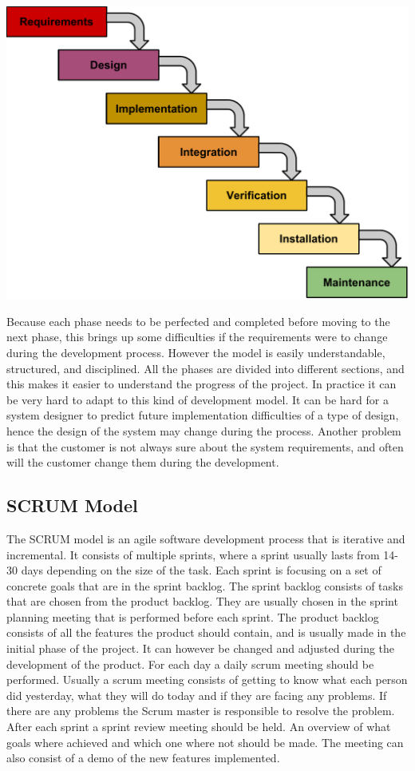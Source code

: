 \includegraphics[scale=0.6]{../Figures/Waterfall-model.pdf}

Because each phase needs to be perfected and completed before moving to the next phase, this brings up some difficulties if the requirements were to change during the development process. 
However the model is easily understandable, structured, and disciplined. 
All the phases are divided into different sections, and this makes it easier to understand the progress of the project.
In practice it can be very hard to adapt to this kind of development model. 
It can be hard for a system designer to predict future implementation difficulties of a type of design, hence the design of the system may change during the process.
Another problem is that the customer is not always sure about the system requirements, and often will the customer change them during the development.

\subsection{SCRUM Model}

The SCRUM model is an agile software development process that is iterative and incremental.
It consists of multiple sprints, where a sprint usually lasts from 14-30 days depending on the size of the task.
Each sprint is focusing on a set of concrete goals that are in the sprint backlog.
The sprint backlog consists of tasks that are chosen from the product backlog. 
They are usually chosen in the sprint planning meeting that is performed before each sprint.
The product backlog consists of all the features the product should contain, and is usually made in the initial phase of the project.
It can however be changed and adjusted during the development of the product.
For each day a daily scrum meeting should be performed. 
Usually a scrum meeting consists of getting to know what each person did yesterday, what they will do today and if they are facing any problems.
If there are any problems the Scrum master is responsible to resolve the problem.
After each sprint a sprint review meeting should be held.
An overview of what goals where achieved and which one where not should be made.
The meeting can also consist of a demo of the new features implemented.

